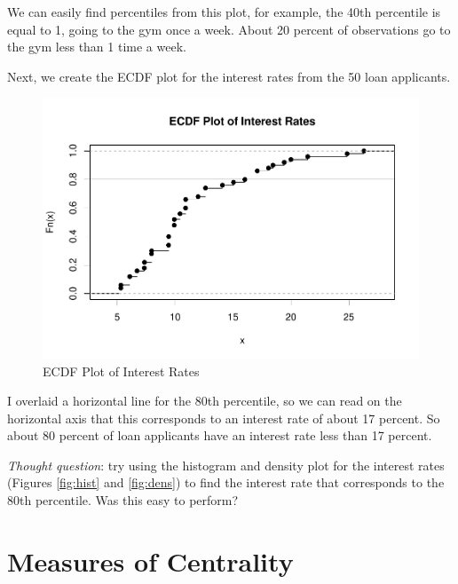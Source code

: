 \documentclass[
]{book}
\newenvironment{Shaded}{\begin{snugshade}}{\end{snugshade}}
\newcommand{\AttributeTok}[1]{\textcolor[rgb]{0.13,0.29,0.53}{#1}}
\newcommand{\FloatTok}[1]{\textcolor[rgb]{0.00,0.00,0.81}{#1}}
\newcommand{\FunctionTok}[1]{\textcolor[rgb]{0.13,0.29,0.53}{\textbf{#1}}}
\newcommand{\NormalTok}[1]{#1}
\newcommand{\SpecialCharTok}[1]{\textcolor[rgb]{0.81,0.36,0.00}{\textbf{#1}}}
\newcommand{\StringTok}[1]{\textcolor[rgb]{0.31,0.60,0.02}{#1}}
\begin{document}
We can easily find percentiles from this plot, for example, the 40th percentile is equal to 1, going to the gym once a week. About 20 percent of observations go to the gym less than 1 time a week.

Next, we create the ECDF plot for the interest rates from the 50 loan applicants.

\begin{Shaded}
\end{Shaded}

\begin{figure}
\centering
\includegraphics{bookdown-demo_files/figure-latex/ecdfreal-1.pdf}
\caption{\label{fig:ecdfreal}ECDF Plot of Interest Rates}
\end{figure}

I overlaid a horizontal line for the 80th percentile, so we can read on the horizontal axis that this corresponds to an interest rate of about 17 percent. So about 80 percent of loan applicants have an interest rate less than 17 percent.

\emph{Thought question}: try using the histogram and density plot for the interest rates (Figures \ref{fig:hist} and \ref{fig:dens}) to find the interest rate that corresponds to the 80th percentile. Was this easy to perform?

\section{Measures of Centrality}\label{measures-of-centrality}
\end{document}
